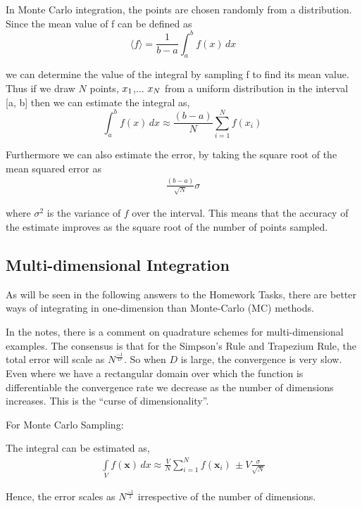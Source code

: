 \documentclass[12pt]{article}
\begin{document}
In Monte Carlo integration, the points are chosen randomly from a distribution. Since the mean value of f can be defined as
\begin{equation}
\langle f\rangle = \frac{1}{b-a}\int_{a}^{b} f(x) \,dx 
\end{equation}

we can determine the value of the integral by sampling f to find its mean value. Thus if we draw $N$ points,  $x\textsubscript{$1$}$,... $x\textsubscript{$N$}$ from a uniform distribution in the interval [a, b] then we can estimate the integral as,
\begin{equation}
\int_{a}^{b} f(x) \,dx \approx \frac{(b-a)}{N}\sum_{i=1}^{N} f(x_{i})\,
\end{equation}

Furthermore we can also estimate the error, by taking the square root of the mean
squared error as
 \begin{align} 
\frac{(b-a)}{\sqrt{N}}\sigma
\end{align}

where $\sigma^2$ is the variance of $f$ over the interval. This means that the accuracy of the estimate improves as the square root of the number of points sampled.

\subsection*{Multi-dimensional Integration}

As will be seen in the following answers to the Homework Tasks, there are better ways of integrating in one-dimension than Monte-Carlo (MC) methods.

In the notes, there is a comment on quadrature schemes for multi-dimensional examples. The consensus is that for the Simpson's Rule and Trapezium Rule, the total error will scale as $N^\frac{-1}{D}$. So when $D$ is large, the convergence is very slow. Even where we have a rectangular domain over which the function is differentiable the convergence rate we decrease as the number of dimensions increases. This is the “curse of dimensionality”.

For Monte Carlo Sampling:

The integral can be estimated as,
 \begin{align} 
\int\limits_V f(\mathbf{x}) \, dx \approx \frac{V}{N}\sum_{i=1}^{N} f(\mathbf{x}_{i})\, \pm V\frac{\sigma}{\sqrt{N}}
\end{align}

Hence, the error scales as $N^{\frac{-1}{2}}$ irrespective of the number of dimensions. 
\end{document}
